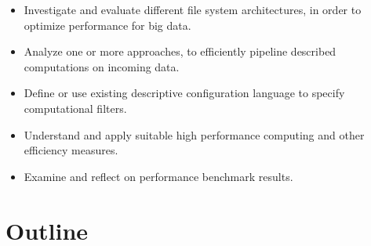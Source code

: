 \begin{itemize}
	\item Investigate and evaluate different file system architectures, in order to optimize performance for big data.	
	\item Analyze one or more approaches, to efficiently pipeline described computations on incoming data.
	\item Define or use existing descriptive configuration language to specify computational filters.
	\item Understand and apply suitable high performance computing and other efficiency measures.
	\item Examine and reflect on performance benchmark results.
\end{itemize}

\section{Outline}

